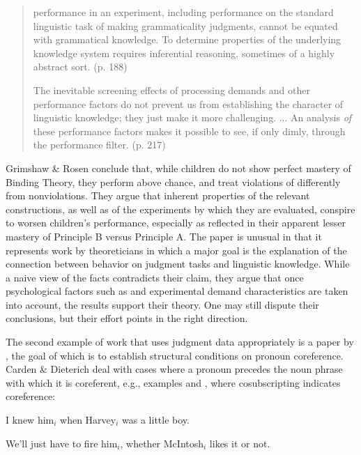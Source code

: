\begin{quote}
performance in an experiment, including performance on the standard linguistic task of making grammaticality judgments, cannot be equated with grammatical knowledge. To determine properties of the underlying knowledge system requires inferential reasoning, sometimes of a highly abstract sort. (p. 188)

The inevitable screening effects of processing demands and other performance factors do not prevent us from establishing the character of linguistic knowledge; they just make it more challenging. ... An analysis \textit{of} these performance factors makes it possible to see, if only
dimly, through the performance filter. (p. 217)
\end{quote}

Grimshaw \& Rosen conclude that, while children do not show perfect mastery of Binding Theory, they perform above chance, and treat violations of  differently from nonviolations. They argue that inherent properties of the relevant constructions, as well as of the experiments by which they are evaluated, conspire to worsen children's performance, especially as reflected in their apparent lesser mastery of Principle B versus Principle A. The paper is unusual in that it represents work by theoreticians in which a major goal is the explanation of the connection between behavior on judgment tasks and linguistic knowledge. While a naive view of the facts contradicts their claim, they argue that once psychological factors such as  and experimental demand characteristics are taken into account, the results support their theory. One may still dispute their conclusions, but their effort points in the right direction.



The second example of work that uses judgment data appropriately is a paper by \citet{CardenEtAl1981}, the goal of which is to establish structural conditions on pronoun coreference. Carden \& Dieterich deal with cases where a pronoun precedes the noun phrase with which it is coreferent, e.g., examples  and , where cosubscripting indicates coreference:


\ea\label{ex:1:1}
I knew him$_i$ when Harvey$_i$ was a little boy.
\z


\ea\label{ex:1:2}
 We'll just have to fire him$_i$, whether McIntosh$_i$ likes it or not.
\z

